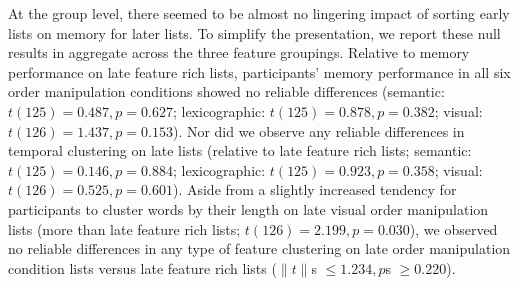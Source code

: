 \documentclass[11pt]{article}
\begin{document}
At the group level, there seemed to be almost no lingering impact of sorting
early lists on memory for later lists. To simplify the presentation, we report
these null results in aggregate across the three feature groupings. Relative to
memory performance on late feature rich lists, participants' memory performance
in all six order manipulation conditions showed no reliable differences
(semantic: $t(125) = 0.487, p = 0.627$; lexicographic: $t(125) = 0.878, p =
0.382$; visual: $t(126) = 1.437, p = 0.153$). Nor did we observe any reliable
differences in temporal clustering on late lists (relative to late feature rich
lists; semantic: $t(125) = 0.146, p = 0.884$; lexicographic: $t(125) = 0.923, p
= 0.358$; visual: $t(126) = 0.525, p = 0.601$). Aside from a slightly increased
tendency for participants to cluster words by their length on late visual order
manipulation lists (more than late feature rich lists; $t(126) = 2.199, p =
0.030$), we observed no reliable differences in any type of feature clustering
on late order manipulation condition lists versus late feature rich lists
($\|t\|$s $\leq 1.234, p$s $\geq 0.220$).








\end{document}
